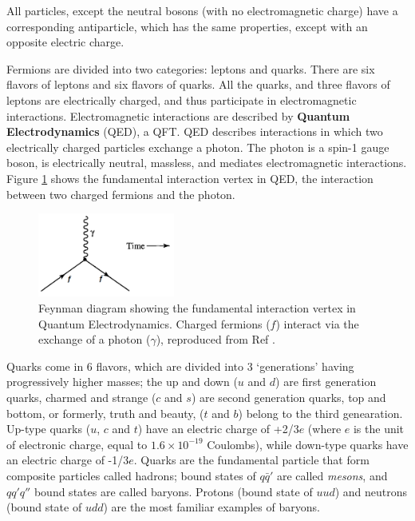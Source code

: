 \documentclass[12pt,a4paper,openright,twoside]{report}
\begin{document}
All particles, except the neutral bosons (with no electromagnetic charge) have a corresponding antiparticle, which has the same properties, except with an opposite electric charge.

Fermions are divided into two categories: leptons and quarks. There are six flavors of leptons and six flavors of quarks. All the quarks, and three flavors of leptons are electrically charged, and thus participate in electromagnetic interactions. Electromagnetic interactions are described by \textbf{Quantum Electrodynamics} (QED)\cite{QED}, a QFT. QED describes interactions in which two electrically charged particles exchange a photon. The photon is a spin-1 gauge boson, is electrically neutral, massless, and mediates electromagnetic interactions. Figure \ref{fig:qed_fund_vertex} shows the fundamental interaction vertex in QED, the interaction between two charged fermions and the photon.

\begin{figure}[H]
\centering
\includegraphics[width = 0.4\textwidth]{fundamental_vertex_qed.png}
\caption{Feynman diagram showing the fundamental interaction vertex in Quantum Electrodynamics. Charged fermions ($f$) interact via the exchange of a photon ($\gamma$), reproduced from Ref \cite{griff}.}
\label{fig:qed_fund_vertex}
\end{figure}

Quarks come in 6 flavors, which are divided into 3 `generations' having progressively higher masses; the up and down ($u$ and $d$) are first generation quarks, charmed and strange ($c$ and $s$) are second generation quarks, top and bottom, or formerly, truth and beauty, ($t$ and $b$) belong to the third genearation. Up-type quarks ($u$, $c$ and $t$) have an electric charge of +2/3$e$ (where $e$ is the unit of electronic charge, equal to $1.6\times 10^{-19}$ Coulombs), while down-type quarks have an electric charge of -1/3$e$. Quarks are the fundamental particle that form composite particles called hadrons; bound states of $q\bar{q}'$ are called \textit{mesons}, and $qq'q''$ bound states are called baryons. Protons (bound state of $uud$) and neutrons (bound state of $udd$) are the most familiar examples of baryons.
\end{document}
